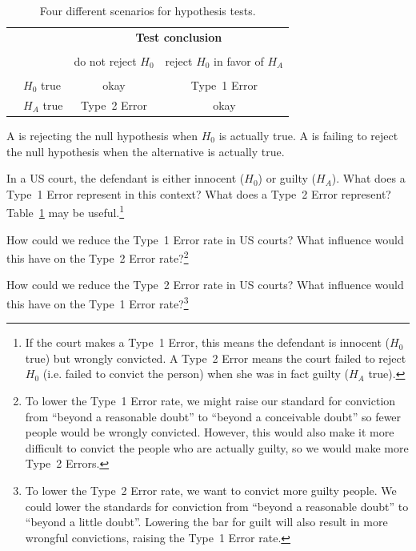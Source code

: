 \begin{table}[ht]
\centering
\begin{tabular}{l l c c}
& & \multicolumn{2}{c}{\textbf{Test conclusion}} \\
  \cline{3-4}
\vspace{-3.7mm} \\
& & do not reject $H_0$ &  reject $H_0$ in favor of $H_A$ \\
  \cline{2-4}
\vspace{-3.7mm} \\
& $H_0$ true & okay &  Type~1 Error \\
\raisebox{1.5ex}{\textbf{Truth}} & $H_A$ true & Type~2 Error & okay \\
  \cline{2-4}
\end{tabular}
\caption{Four different scenarios for hypothesis tests.}
\label{fourHTScenarios}
\end{table}

A  is rejecting the null hypothesis when $H_0$ is actually true. A  is failing to reject the null hypothesis when the alternative is actually true.

\begin{exercise} \label{whatAreTheErrorTypesInUSCourts}
In a US court, the defendant is either innocent ($H_0$) or  guilty ($H_A$). What does a Type~1 Error represent in this context? What does a Type~2 Error represent? Table~\ref{fourHTScenarios} may be useful.\footnote{If the court makes a Type~1 Error, this means the defendant is innocent ($H_0$ true) but wrongly convicted. A Type~2 Error means the court failed to reject $H_0$ (i.e. failed to convict the person) when she was in fact guilty ($H_A$ true).}
\end{exercise}

\begin{exercise} \label{howToReduceType1ErrorsInUSCourts}
How could we reduce the Type~1 Error rate in US courts? What influence would this have on the Type~2 Error rate?\footnote{To lower the Type~1 Error rate, we might raise our standard for conviction from ``beyond a reasonable doubt'' to ``beyond a conceivable doubt'' so fewer people would be wrongly convicted. However, this would also make it more difficult to convict the people who are actually guilty, so we would make more Type~2 Errors.}
\end{exercise}

\begin{exercise} \label{howToReduceType2ErrorsInUSCourts}
How could we reduce the Type~2 Error rate in US courts? What influence would this have on the Type~1 Error rate?\footnote{To lower the Type~2 Error rate, we want to convict more guilty people. We could lower the standards for conviction from ``beyond a reasonable doubt'' to ``beyond a little doubt''. Lowering the bar for guilt will also result in more wrongful convictions, raising the Type~1 Error rate.}
\end{exercise}

